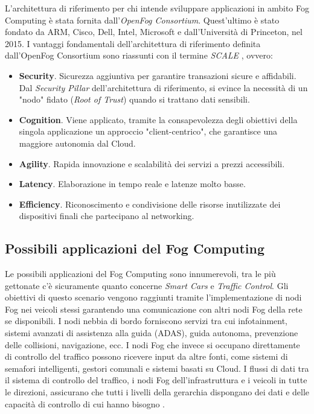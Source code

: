 L'architettura di riferimento per chi intende sviluppare applicazioni in ambito Fog Computing è stata fornita dall'\textit{OpenFog Consortium}. Quest'ultimo è stato fondato da ARM, Cisco, Dell, Intel, Microsoft e dall'Università di Princeton, nel 2015. I vantaggi fondamentali dell'architettura di riferimento definita dall'OpenFog Consortium sono riassunti con il termine \textit{SCALE} \cite{OpenFogReferenceArchitecture}, ovvero:

\begin{itemize}
	\item \textbf{Security}. Sicurezza aggiuntiva per garantire transazioni sicure e affidabili. Dal \textit{Security Pillar} dell'architettura di riferimento, si evince la necessità di un "nodo" fidato (\textit{Root of Trust}) quando si trattano dati sensibili.
	\item \textbf{Cognition}. Viene applicato, tramite la consapevolezza degli obiettivi della singola applicazione un approccio "client-centrico", che garantisce una maggiore autonomia dal Cloud.
	\item \textbf{Agility}. Rapida innovazione e scalabilità dei servizi a prezzi accessibili.
	\item \textbf{Latency}. Elaborazione in tempo reale e latenze molto basse.
	\item \textbf{Efficiency}. Riconoscimento e condivisione delle risorse inutilizzate dei dispositivi finali che partecipano al networking.
\end{itemize}

\subsection{Possibili applicazioni del Fog Computing}

Le possibili applicazioni del Fog Computing sono innumerevoli, tra le più gettonate c'è sicuramente quanto concerne \textit{Smart Cars} e \textit{Traffic Control}. Gli obiettivi di questo scenario vengono raggiunti tramite l'implementazione di nodi Fog nei veicoli stessi garantendo una comunicazione con altri nodi Fog della rete se disponibili. I nodi nebbia di bordo forniscono servizi tra cui infotainment, sistemi avanzati di assistenza alla guida (ADAS), guida autonoma, prevenzione delle collisioni, navigazione, ecc. I nodi Fog che invece si occupano direttamente di controllo del traffico possono ricevere input da altre fonti, come sistemi di semafori intelligenti, gestori comunali e sistemi basati su Cloud. I flussi di dati tra il sistema di controllo del traffico, i nodi Fog dell'infrastruttura e i veicoli in tutte le direzioni, assicurano che tutti i livelli della gerarchia dispongano dei dati e delle capacità di controllo di cui hanno bisogno \cite{FogForTrafficControl}.


